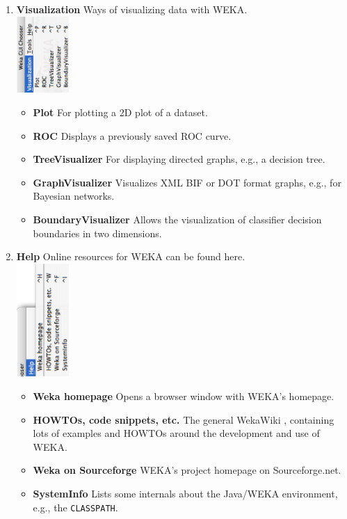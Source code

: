 \begin{enumerate}
	\item \textbf{Visualization} Ways of visualizing data with WEKA. \\
		\includegraphics[angle=270,width=2cm]{images/launching/guic_visualization.eps}
		\begin{itemize}
			\item \textbf{Plot} For plotting a 2D plot of a dataset.
			\item \textbf{ROC} Displays a previously saved ROC curve.
			\item \textbf{TreeVisualizer} For displaying directed graphs, e.g., a decision tree.
			\item \textbf{GraphVisualizer} Visualizes XML BIF or DOT format graphs, e.g., for Bayesian networks.
			\item \textbf{BoundaryVisualizer} Allows the visualization of classifier decision boundaries in two dimensions.
		\end{itemize}
		
		
	\item \textbf{Help} Online resources for WEKA can be found here. \\
	        \includegraphics[angle=270,width=2cm]{images/launching/guic_help.eps}
		\begin{itemize}
			\item \textbf{Weka homepage} Opens a browser window with WEKA's homepage.
			\item \textbf{HOWTOs, code snippets, etc.} The general WekaWiki \cite{wekawiki}, containing lots of examples and HOWTOs around the development and use of WEKA.
			\item \textbf{Weka on Sourceforge} WEKA's project homepage on Sourceforge.net.
			\item \textbf{SystemInfo} Lists some internals about the Java/WEKA environment, e.g., the \texttt{CLASSPATH}.
		\end{itemize}
\end{enumerate}

